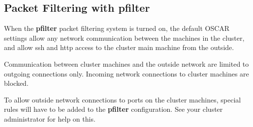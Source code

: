 %
%

\subsection{Packet Filtering with pfilter}
\label{app:pfilter-overview}

When the {\bf pfilter} packet filtering system is turned on, the
default OSCAR settings allow any network communication between the
machines in the cluster, and allow ssh and http access to the cluster
main machine from the outside.

Communication between cluster machines and the outside network are
limited to outgoing connections only.  Incoming network connections to
cluster machines are blocked.

To allow outside network connections to ports on the cluster machines,
special rules will have to be added to the {\bf pfilter}
configuration.  See your cluster administrator for help on this.
